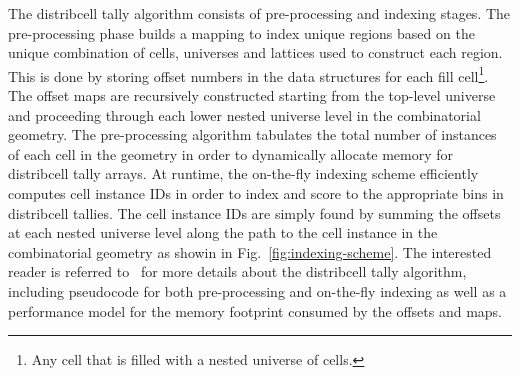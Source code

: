 The distribcell tally algorithm consists of pre-processing and indexing stages. The pre-processing phase builds a mapping to index unique regions based on the unique combination of cells, universes and lattices used to construct each region. This is done by storing offset numbers in the data structures for each fill cell\footnote{Any cell that is filled with a nested universe of cells.}. The offset maps are recursively constructed starting from the top-level universe and proceeding through each lower nested universe level in the combinatorial geometry. The pre-processing algorithm tabulates the total number of instances of each cell in the geometry in order to dynamically allocate memory for distribcell tally arrays. At runtime, the on-the-fly indexing scheme efficiently computes cell instance IDs in order to index and score to the appropriate bins in distribcell tallies. The cell instance IDs are simply found by summing the offsets at each nested universe level along the path to the cell instance in the combinatorial geometry as showin in Fig.~\ref{fig:indexing-scheme}. The interested reader is referred to~\cite{lax2014distribcell} for more details about the distribcell tally algorithm, including pseudocode for both pre-processing and on-the-fly indexing as well as a performance model for the memory footprint consumed by the offsets and maps.
  
